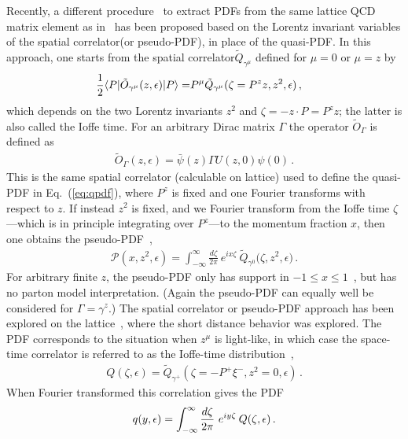 \documentclass[prd,aps,twocolumn,preprintnumbers,showpacs,nofootinbib,superscriptaddress,notitlepage]{revtex4-1}
\newcommand{\spcorr}{spatial correlator\xspace}
\DeclareRobustCommand{\eq}[1]{Eq.~(\ref{eq:#1})}
\begin{document}
Recently, a different procedure~\cite{Radyushkin:2017cyf} to extract PDFs from the same lattice QCD matrix element as in~\cite{Ji:2013dva}
has been proposed based on the Lorentz invariant variables of the \spcorr (or pseudo-PDF), in place of the quasi-PDF. In this approach, one starts from the \spcorr $\tilde{Q}_{\gamma^\mu}$ defined for $\mu=0$ or $\mu=z$ by
\begin{align}
	{1\over2}\langle P | \tilde{O}_{\gamma^\mu}(z,\epsilon) | P\rangle
	= & P^\mu \tilde{Q}_{\gamma^\mu}(\zeta=P^zz,z^2,\epsilon) \,,	
\end{align}
which depends on the two Lorentz invariants $z^2$ and $\zeta=-z\cdot P = P^z z$; the latter is also called the Ioffe time.
For an arbitrary Dirac matrix $\Gamma$ the operator $\tilde{O}_\Gamma$ is defined as
\begin{align} \label{eq:OGamma}
	\tilde{O}_{\Gamma}(z,\epsilon)  = \bar{\psi}  (z) \Gamma U (z, 0) \psi (0) \,.
\end{align}
This is the same spatial correlator (calculable on lattice) used to define the quasi-PDF in \eq{qpdf}, where $P^z$ is fixed and one Fourier transforms with respect to $z$. If instead $z^2$ is fixed, and we Fourier transform from the Ioffe time $\zeta$---which is in principle integrating over $P^z$---to the momentum fraction $x$, then one obtains the pseudo-PDF~\cite{Radyushkin:2017cyf},
\begin{align} \label{eq:pseudo}
\mathcal{P} \left( x, z^2,\epsilon\right)
   = \int_{-\infty}^\infty \! \frac{d \zeta}{2\pi}\:
    e^{ix \zeta}\: \tilde{Q}_{\gamma^0}\bigl( \zeta, z^2,\epsilon \bigr)
   \,.
\end{align}
For arbitrary finite $z$, the pseudo-PDF only has support in $-1\le x \le 1$~\cite{Radyushkin:1983wh,Radyushkin:2016hsy}, but has no parton model interpretation.
(Again the pseudo-PDF can equally well be considered for $\Gamma=\gamma^z$.) The \spcorr or pseudo-PDF approach has been explored on the lattice~\cite{Orginos:2017kos,Karpie:2017bzm}, where the short distance behavior was explored.
The PDF corresponds to the situation when $z^\mu$ is light-like, in which case the space-time correlator is referred to as the Ioffe-time distribution~\cite{Ioffe:1969kf},
\begin{align}
 Q(\zeta,\epsilon) = \tilde Q_{\gamma^+}(\zeta=-P^+\xi^-,z^2=0,\epsilon)
  \,.
\end{align}
When Fourier transformed this correlation gives the PDF
\begin{align} \label{eq:Qdefn}
q(y,\epsilon) =\int_{-\infty}^{\infty} {d\zeta\over 2\pi} \ e^{iy\zeta}\: Q(\zeta,\epsilon)\,.
\end{align}
\end{document}
